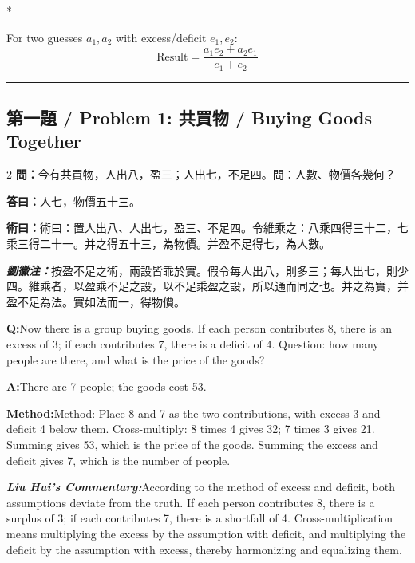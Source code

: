 \documentclass[11pt,a4paper]{article}
\newcommand{\cnwen}{\textcolor{cnlabelfg}{\textbf{問：}}}
\newcommand{\cnda}{\textbf{答曰：}}
\newcommand{\cnshu}{\textcolor{cnlabelfg}{\textbf{術曰：}}}
\newcommand{\cnzhu}{\textcolor{commentarycolor}{\textit{\textbf{劉徽注：}}}}
\newcommand{\enwen}{\textcolor{enlabelfg}{\textbf{Q:}}}
\newcommand{\enda}{\textcolor{enlabelfg}{\textbf{A:}}}
\newcommand{\enshu}{\textcolor{enlabelfg}{\textbf{Method:}}}
\newcommand{\enzhu}{\textcolor{enlabelfg}{\textit{\textbf{Liu Hui's Commentary:}}}}
\newenvironment{mathdisplay}{\switchcolumn[0]*}{\switchcolumn[0]}
\begin{document}
\begin{mathdisplay}
\begin{tcolorbox}[colback=methodbg,colframe=sectioncolor,title=General Formula,fonttitle=\bfseries,boxrule=0.5pt]
For two guesses $a_1, a_2$ with excess/deficit $e_1, e_2$:
\[\text{Result} = \frac{a_1 e_2 + a_2 e_1}{e_1 + e_2}\]
\end{tcolorbox}
\end{mathdisplay}

\bigskip\hrule\bigskip

\subsection{第一題 / Problem 1: 共買物 / Buying Goods Together}

\begin{paracol}{2}
\switchcolumn[0]
\cnwen 今有共買物，人出八，盈三；人出七，不足四。問：人數、物價各幾何？

\cnda 人七，物價五十三。

\cnshu 術曰：置人出八、人出七，盈三、不足四。令維乘之：八乘四得三十二，七乘三得二十一。并之得五十三，為物價。并盈不足得七，為人數。

\cnzhu 按盈不足之術，兩設皆乖於實。假令每人出八，則多三；每人出七，則少四。維乘者，以盈乘不足之設，以不足乘盈之設，所以通而同之也。并之為實，并盈不足為法。實如法而一，得物價。

\switchcolumn[1]
\enwen Now there is a group buying goods. If each person contributes 8, there is an excess of 3; if each contributes 7, there is a deficit of 4. Question: how many people are there, and what is the price of the goods?

\enda There are 7 people; the goods cost 53.

\enshu Method: Place 8 and 7 as the two contributions, with excess 3 and deficit 4 below them. Cross-multiply: 8 times 4 gives 32; 7 times 3 gives 21. Summing gives 53, which is the price of the goods. Summing the excess and deficit gives 7, which is the number of people.

\enzhu According to the method of excess and deficit, both assumptions deviate from the truth. If each person contributes 8, there is a surplus of 3; if each contributes 7, there is a shortfall of 4. Cross-multiplication means multiplying the excess by the assumption with deficit, and multiplying the deficit by the assumption with excess, thereby harmonizing and equalizing them.
\end{paracol}
\end{document}
